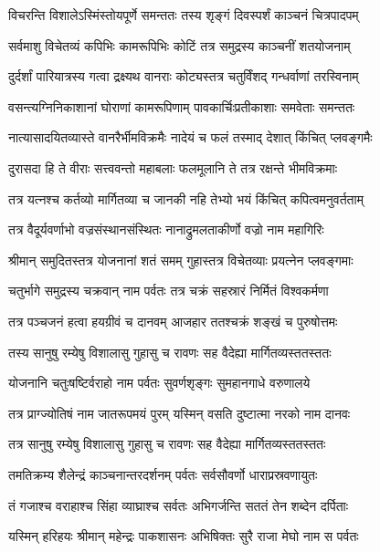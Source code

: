 \twolineshloka
{विचरन्ति विशालेऽस्मिंस्तोयपूर्णे समन्ततः}
{तस्य शृङ्गं दिवस्पर्शं काञ्चनं चित्रपादपम्} %

\twolineshloka
{सर्वमाशु विचेतव्यं कपिभिः कामरूपिभिः}
{कोटिं तत्र समुद्रस्य काञ्चनीं शतयोजनाम्} %

\twolineshloka
{दुर्दर्शां पारियात्रस्य गत्वा द्रक्ष्यथ वानराः}
{कोट्यस्तत्र चतुर्विंशद् गन्धर्वाणां तरस्विनाम्} %

\twolineshloka
{वसन्त्यग्निनिकाशानां घोराणां कामरूपिणाम्}
{पावकार्चिःप्रतीकाशाः समवेताः समन्ततः} %

\twolineshloka
{नात्यासादयितव्यास्ते वानरैर्भीमविक्रमैः}
{नादेयं च फलं तस्माद् देशात् किंचित् प्लवङ्गमैः} %

\twolineshloka
{दुरासदा हि ते वीराः सत्त्ववन्तो महाबलाः}
{फलमूलानि ते तत्र रक्षन्ते भीमविक्रमाः} %

\twolineshloka
{तत्र यत्नश्च कर्तव्यो मार्गितव्या च जानकी}
{नहि तेभ्यो भयं किंचित् कपित्वमनुवर्तताम्} %

\twolineshloka
{तत्र वैदूर्यवर्णाभो वज्रसंस्थानसंस्थितः}
{नानाद्रुमलताकीर्णो वज्रो नाम महागिरिः} %

\twolineshloka
{श्रीमान् समुदितस्तत्र योजनानां शतं समम्}
{गुहास्तत्र विचेतव्याः प्रयत्नेन प्लवङ्गमाः} %

\twolineshloka
{चतुर्भागे समुद्रस्य चक्रवान् नाम पर्वतः}
{तत्र चक्रं सहस्रारं निर्मितं विश्वकर्मणा} %

\twolineshloka
{तत्र पञ्चजनं हत्वा हयग्रीवं च दानवम्}
{आजहार ततश्चक्रं शङ्खं च पुरुषोत्तमः} %

\twolineshloka
{तस्य सानुषु रम्येषु विशालासु गुहासु च}
{रावणः सह वैदेह्या मार्गितव्यस्ततस्ततः} %

\twolineshloka
{योजनानि चतुःषष्टिर्वराहो नाम पर्वतः}
{सुवर्णशृङ्गः सुमहानगाधे वरुणालये} %

\twolineshloka
{तत्र प्राग्ज्योतिषं नाम जातरूपमयं पुरम्}
{यस्मिन् वसति दुष्टात्मा नरको नाम दानवः} %

\twolineshloka
{तत्र सानुषु रम्येषु विशालासु गुहासु च}
{रावणः सह वैदेह्या मार्गितव्यस्ततस्ततः} %

\twolineshloka
{तमतिक्रम्य शैलेन्द्रं काञ्चनान्तरदर्शनम्}
{पर्वतः सर्वसौवर्णो धाराप्रस्रवणायुतः} %

\twolineshloka
{तं गजाश्च वराहाश्च सिंहा व्याघ्राश्च सर्वतः}
{अभिगर्जन्ति सततं तेन शब्देन दर्पिताः} %

\twolineshloka
{यस्मिन् हरिहयः श्रीमान् महेन्द्रः पाकशासनः}
{अभिषिक्तः सुरै राजा मेघो नाम स पर्वतः} %

